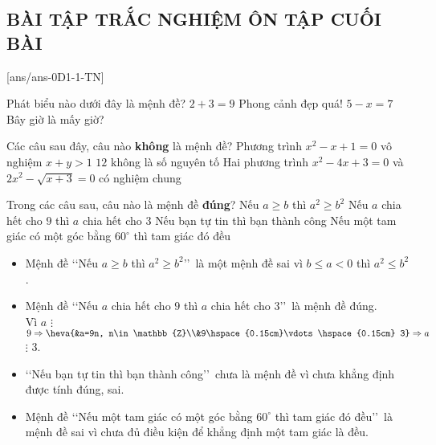 \subsection{BÀI TẬP TRẮC NGHIỆM ÔN TẬP CUỐI BÀI}

[ans/ans-0D1-1-TN]

\begin{ex}%
	Phát biểu nào dưới đây là mệnh đề?
	\choice
	{\True $2+3=9$}
	{Phong cảnh đẹp quá!}
	{$5-x=7$}
	{Bây giờ là mấy giờ?}
\end{ex}
\begin{ex}%
	Các câu sau đây, câu nào {\bf không} là mệnh đề?
	\choice
	{Phương trình $ x^2-x+1=0$ vô nghiệm}
	{\True $x+y>1$}
	{$12$ không là số nguyên tố}
	{Hai phương trình $ x^2-4x+3=0$ và $ 2x^2-\sqrt{x+3}=0$ có nghiệm chung}
\end{ex}
\begin{ex}%
	Trong các câu sau, câu nào là mệnh đề \textbf{đúng}?
	\choice
	{Nếu $a\ge b$ thì $a^2\ge b^2$}
	{\True Nếu $a$ chia hết cho $9$ thì $a$ chia hết cho $3$}
	{Nếu bạn tự tin thì bạn thành công}
	{Nếu một tam giác có một góc bằng $60^\circ $ thì tam giác đó đều}
	\loigiai
	{
		\begin{itemize}
			\item Mệnh đề \lq\lq  Nếu $a\ge b$ thì $a^2\ge b^2$\rq\rq\ là một mệnh đề sai vì $b\le a < 0$ thì $a^2\le b^2$ .
			\item Mệnh đề \lq\lq  Nếu $a$ chia hết cho $9$ thì $a$ chia hết cho $3$\rq\rq\ là mệnh đề đúng.\\
			Vì $a$ $\vdots$ $9\Rightarrow \heva{&a=9n, n\in \mathbb{Z}\\&9\hspace{0.15cm}\vdots\hspace{0.15cm} 3}\Rightarrow a$ $\vdots$  $3$.
			\item \lq\lq  Nếu bạn tự tin thì bạn thành công\rq\rq\ chưa là mệnh đề vì chưa khẳng định được tính đúng, sai.
			\item Mệnh đề \lq\lq  Nếu một tam giác có một góc bằng $60^\circ $ thì tam giác đó đều\rq\rq\ là mệnh đề sai vì chưa đủ điều kiện để khẳng định một tam giác là đều.
		\end{itemize}
	}
\end{ex}
